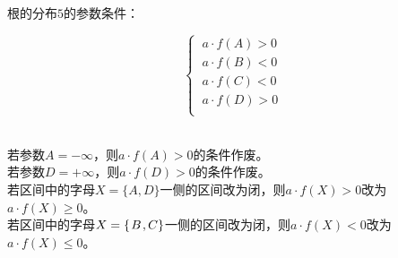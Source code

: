 \documentclass[UTF8]{ctexart}
\begin{document}
    根的分布$5$的参数条件：
    \begin{large}
        \begin{equation*}
            \begin{cases}
                ~a\cdot f(A)>0\\[1mm]
                ~a\cdot f(B)<0\\[1mm]
                ~a\cdot f(C)<0\\[1mm]
                ~a\cdot f(D)>0\\[1mm]
            \end{cases}
        \end{equation*}
    \end{large}\\
    若参数$A=-\infty$，则$a\cdot f(A)>0$的条件作废。\\[3mm]
    若参数$D=+\infty$，则$a\cdot f(D)>0$的条件作废。\\[3mm]
    若区间中的字母$X=\{A,D\}$一侧的区间改为闭，则$a\cdot f(X)>0$改为$a\cdot f(X)\geq 0$。\\[3mm]
    若区间中的字母$X=\{\hspace{1.0pt}B\hspace{1.0pt},C\}$一侧的区间改为闭，则$a\cdot f(X)<0$改为$a\cdot f(X)\leq 0$。

\newpage
\end{document}
